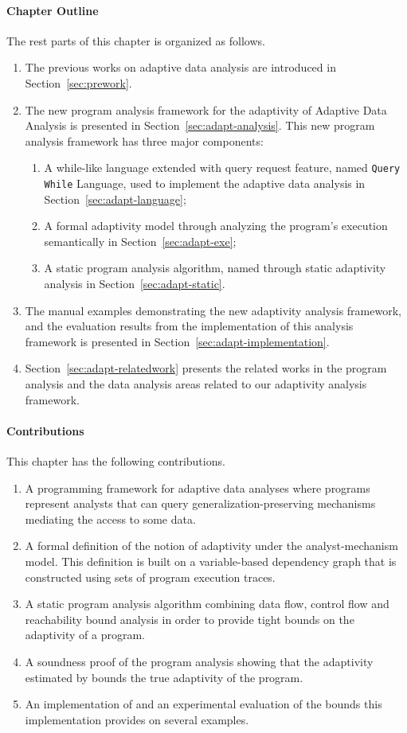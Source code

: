 \paragraph*{Chapter Outline}
The rest parts of this chapter is organized as follows. 
\begin{enumerate}
   \item The previous works on adaptive data analysis are introduced in Section~\ref{sec:prework}.
   \item The new program analysis framework for the adaptivity of Adaptive Data Analysis is presented 
   in Section~\ref{sec:adapt-analysis}.
   This new program analysis framework has three major components:
   \begin{enumerate}
      \item A while-like language extended with query request feature, named {\tt Query While} Language, 
      used to implement the adaptive data analysis in Section~\ref{sec:adapt-language};
      \item A formal adaptivity model through analyzing the program's execution semantically in Section~\ref{sec:adapt-exe};
      \item A static program analysis algorithm, named {\THESYSTEM} through static adaptivity analysis in Section~\ref{sec:adapt-static}.
   \end{enumerate}
   \item The manual examples demonstrating the new adaptivity analysis framework,
   and the evaluation results from the implementation
   of this analysis framework is presented in Section~\ref{sec:adapt-implementation}.
   \item Section~\ref{sec:adapt-relatedwork} presents the related works in the program analysis and the data analysis areas
   related to our adaptivity analysis framework.
\end{enumerate}


\paragraph{Contributions}
This chapter has the following contributions.
\begin{enumerate}
   \item A programming framework for adaptive data analyses where programs represent analysts that can query generalization-preserving mechanisms mediating the access to some data. 
   \item 
   A formal definition of the notion of adaptivity under the analyst-mechanism model. 
   This definition is built on a variable-based dependency graph that is constructed using sets of program execution traces.
   \item 
   A static program analysis algorithm {\THESYSTEM} combining data flow, control flow and  reachability bound analysis in order to provide tight bounds on the adaptivity of a program.
   \item A soundness proof of the program analysis showing that the adaptivity estimated by {\THESYSTEM} bounds the true adaptivity of the program. 
   \item An implementation of {\THESYSTEM} and an experimental evaluation of the bounds this implementation provides on several examples.
\end{enumerate}